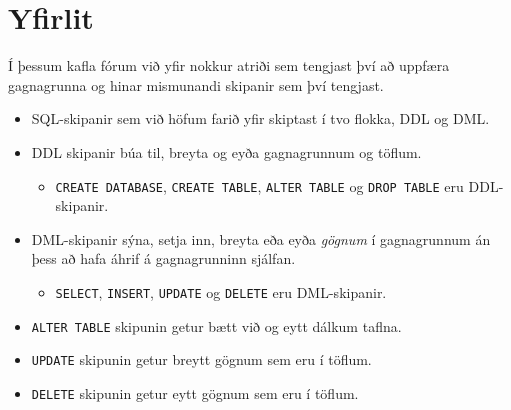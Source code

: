 \section{Yfirlit}
Í þessum kafla fórum við yfir nokkur atriði sem tengjast því að uppfæra gagnagrunna og hinar mismunandi skipanir sem því tengjast.
\begin{itemize}
 \item SQL-skipanir sem við höfum farið yfir skiptast í tvo flokka, DDL og DML.
 \item DDL skipanir búa til, breyta og eyða gagnagrunnum og töflum.
 \begin{itemize}
  \item \verb|CREATE DATABASE|, \verb|CREATE TABLE|, \verb|ALTER TABLE| og \verb|DROP TABLE| eru DDL-skipanir.
 \end{itemize}
 \item DML-skipanir sýna, setja inn, breyta eða eyða \emph{gögnum} í gagnagrunnum án þess að hafa áhrif á gagnagrunninn sjálfan.
 \begin{itemize}
  \item \verb|SELECT|, \verb|INSERT|, \verb|UPDATE| og \verb|DELETE| eru DML-skipanir.
 \end{itemize}
 \item \verb|ALTER TABLE| skipunin getur bætt við og eytt dálkum taflna.
 \item \verb|UPDATE| skipunin getur breytt gögnum sem eru í töflum.
 \item \verb|DELETE| skipunin getur eytt gögnum sem eru í töflum.
\end{itemize}
